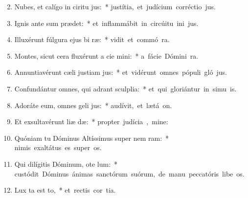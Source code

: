 \begin{flushleft}
\begin{enumerate}[leftmargin=*]
\setcounter{enumi}{1}

\item Nubes, et calígo in ciritu jus:~* \mbox{justítia, et judícium corréctio  jus.}

\item Ignis ante sum prædet:~* \mbox{et inflammábit in circúitu ini jus.}

\item Illuxérunt fúlgura ejus bi ræ:~* \mbox{vidit et commó  ra.}

\item Montes, sicut cera fluxérunt a cie mini:~* \mbox{a fácie Dómini  ra.}

\item Annuntiavérunt cæli justiam jus:~* \mbox{et vidérunt omnes pópuli gló jus.}

\item Confundántur omnes, qui adrant sculplia:~* \mbox{et qui gloriántur in simu is.}

\item Adoráte eum, omnes geli jus:~* \mbox{audívit, et lætá  on.}

\item Et exsultavérunt liæ dæ:~* \mbox{propter judícia , mine:}

\item Quóniam tu Dóminus Altíssimus super nem ram:~* \mbox{nimis exaltátus es super  os.}

\item Qui dilígitis Dóminum, ote lum:~* \mbox{custódit Dóminus ánimas sanctórum suórum, de manu peccatóris libe os.}

\item Lux ta est to,~* \mbox{et rectis cor tia.}


\end{enumerate}
\end{flushleft}
